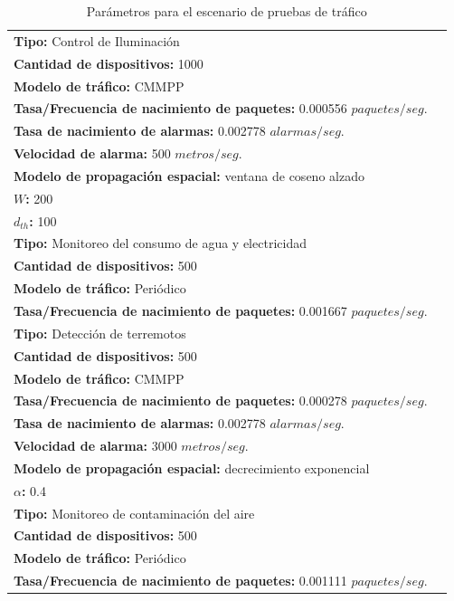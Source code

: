 \begin{table}
    \caption{Parámetros para el escenario de pruebas de tráfico}
    \label{tab:paramPruebaTrafico}
    \centering
    \begin{tabular}{|m{16cm}|p{20cm}|} \\ 
        \textbf{Tipo:} Control de Iluminación\\ \textbf{Cantidad de dispositivos:} 1000 \\ \textbf{Modelo de tráfico:} CMMPP \\ \textbf{Tasa/Frecuencia de nacimiento de paquetes:} 0.000556  $paquetes/seg$. \\ \textbf{Tasa de nacimiento de alarmas:} 0.002778 $alarmas/seg$. \\ \textbf{Velocidad de alarma:} 500 $metros/seg$. \\ \textbf{Modelo de propagación espacial:} ventana de coseno alzado \\ \textbf{$W$:} 200 \\ \textbf{$d_{th}$:} 100 \\ \hline
        \textbf{Tipo:} Monitoreo del consumo de agua y electricidad \\ \textbf{Cantidad de dispositivos:} 500 \\ \textbf{Modelo de tráfico:} Periódico \\ \textbf{Tasa/Frecuencia de nacimiento de paquetes:} 0.001667  $paquetes/seg$. \\ \hline
        \textbf{Tipo:} Detección de terremotos\\ \textbf{Cantidad de dispositivos:} 500 \\ \textbf{Modelo de tráfico:} CMMPP \\ \textbf{Tasa/Frecuencia de nacimiento de paquetes:} 0.000278  $paquetes/seg$. \\ \textbf{Tasa de nacimiento de alarmas:} 0.002778 $alarmas/seg$. \\ \textbf{Velocidad de alarma:} 3000 $metros/seg$. \\ \textbf{Modelo de propagación espacial:} decrecimiento exponencial \\ \textbf{$\alpha$:} 0.4 \\ \hline
        \textbf{Tipo:} Monitoreo de contaminación del aire\\ \textbf{Cantidad de dispositivos:} 500 \\ \textbf{Modelo de tráfico:} Periódico \\ \textbf{Tasa/Frecuencia de nacimiento de paquetes:} 0.001111  $paquetes/seg$. \\ \hline

\end{tabular}
\end{table}
